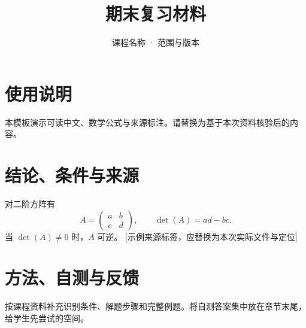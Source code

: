 \documentclass[UTF8,fontset=fandol,zihao=-4]{ctexart}
\title{期末复习材料}
\author{课程名称 · 范围与版本}
\date{}
\makeatletter
\newcommand{\sourceref}[1]{{\small\color{sourcegray}[#1]}}
\renewcommand{\maketitle}{%
  \begin{center}
    {\LARGE\bfseries\@title\par}
    \vspace{0.6em}{\normalsize\@author\par}
  \end{center}\vspace{0.5em}
}
\makeatother
\begin{document}
\maketitle
\section{使用说明}
本模板演示可读中文、数学公式与来源标注。请替换为基于本次资料核验后的内容。

\section{结论、条件与来源}
对二阶方阵有
\[
A=\begin{pmatrix}a&b\\c&d\end{pmatrix},
\qquad \det(A)=ad-bc.
\]
当 $\det(A)\ne0$ 时，$A$ 可逆。
\sourceref{示例来源标签，应替换为本次实际文件与定位}

\section{方法、自测与反馈}
按课程资料补充识别条件、解题步骤和完整例题。将自测答案集中放在章节末尾，给学生先尝试的空间。
\end{document}
